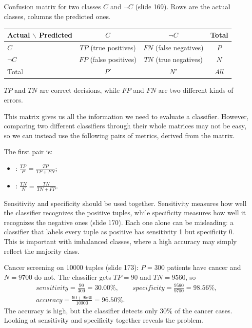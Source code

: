 \begin{example}
Confusion matrix for two classes $C$ and $\neg C$ (slide 169). Rows are the actual classes, columns the predicted ones.
\begin{center}
\begin{tabular}{lccc}
  \toprule
  Actual $\backslash$ Predicted & $C$ & $\neg C$ & Total \\
  \midrule
  $C$ & $TP$ (true positives) & $FN$ (false negatives) & $P$ \\
  $\neg C$ & $FP$ (false positives) & $TN$ (true negatives) & $N$ \\
  \midrule
  Total & $P'$ & $N'$ & $All$ \\
  \bottomrule
\end{tabular}
\end{center}
$TP$ and $TN$ are correct decisions, while $FP$ and $FN$ are two different kinds of errors.
\end{example}

This matrix gives us all the information we need to evaluate a classifier. However, comparing two different classifiers through their whole matrices may not be easy, so we can instead use the following pairs of metrics, derived from the matrix.

The first pair is:
\begin{itemize}
  \item {}: $\displaystyle \frac{TP}{P} = \frac{TP}{TP + FN}$;
  \item {}: $\displaystyle \frac{TN}{N} = \frac{TN}{TN + FP}$.
\end{itemize}

Sensitivity and specificity should be used together. Sensitivity measures how well the classifier recognizes the positive tuples, while specificity measures how well it recognizes the negative ones (slide 170). Each one alone can be misleading: a classifier that labels every tuple as positive has sensitivity 1 but specificity 0. This is important with imbalanced classes, where a high accuracy may simply reflect the majority class.

\begin{example}
Cancer screening on $10000$ tuples (slide 173): $P = 300$ patients have cancer and $N = 9700$ do not. The classifier gets $TP = 90$ and $TN = 9560$, so
\begin{gather*}
  sensitivity = \frac{90}{300} = 30.00\%, \qquad specificity = \frac{9560}{9700} = 98.56\%, \\
  accuracy = \frac{90 + 9560}{10000} = 96.50\%.
\end{gather*}
The accuracy is high, but the classifier detects only $30\%$ of the cancer cases. Looking at sensitivity and specificity together reveals the problem.
\end{example}

